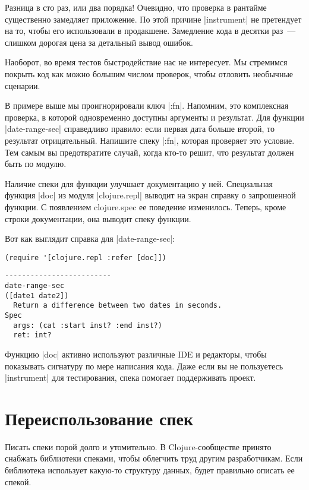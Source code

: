 Разница в сто раз, или два порядка! Очевидно, что проверка в рантайме
существенно замедляет приложение. По этой причине \spverb|instrument| не претендует на
то, чтобы его использовали в продакшене. Замедление кода в десятки раз~--- слишком
дорогая цена за детальный вывод ошибок.

Наоборот, во время тестов быстродействие нас не интересует. Мы стремимся покрыть
код как можно большим числом проверок, чтобы отловить необычные сценарии.

В примере выше мы проигнорировали ключ \spverb|:fn|. Напомним, это комплексная
проверка, в которой одновременно доступны аргументы и результат. Для функции
\spverb|date-range-sec| справедливо правило: если первая дата больше второй, то
результат отрицательный. Напишите спеку \spverb|:fn|, которая проверяет это
условие. Тем самым вы предотвратите случай, когда кто-то решит, что результат
должен быть по модулю.

Наличие спеки для функции улучшает документацию у ней. Специальная функция \spverb|doc|
из модуля \spverb|clojure.repl| выводит на экран справку о запрошенной функции. С
появлением clojure.spec ее поведение изменилось. Теперь, кроме строки
документации, она выводит спеку функции.

Вот как выглядит справка для \spverb|date-range-sec|:

\begin{verbatim}
(require '[clojure.repl :refer [doc]])
\end{verbatim}

\begin{verbatim}
-------------------------
date-range-sec
([date1 date2])
  Return a difference between two dates in seconds.
Spec
  args: (cat :start inst? :end inst?)
  ret: int?
\end{verbatim}

Функцию \spverb|doc| активно используют различные IDE и редакторы, чтобы показывать
сигнатуру по мере написания кода. Даже если вы не пользуетесь \spverb|instrument| для
тестирования, спека помогает поддерживать проект.

\section{Переиспользование спек}

Писать спеки порой долго и утомительно. В Clojure-сообществе принято снабжать
библиотеки спеками, чтобы облегчить труд другим разработчикам. Если библиотека
использует какую-то структуру данных, будет правильно описать ее спекой.

